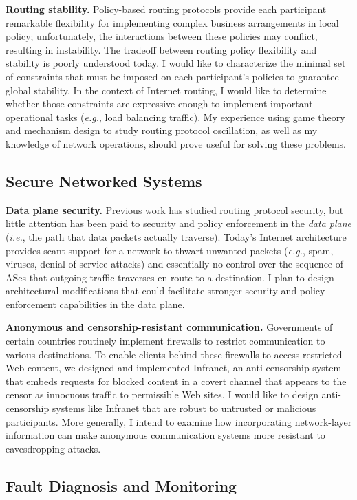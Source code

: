 \documentclass[11pt]{article}
\newcommand{\ie}{{\em i.e.}}
\newcommand{\eg}{{\em e.g.}}
\begin{document}
{\bf Routing stability.}  Policy-based routing protocols provide each
participant remarkable flexibility for implementing complex business
arrangements in local policy; unfortunately, the interactions between
these policies may conflict, resulting in instability.  The tradeoff
between routing policy flexibility and stability is poorly understood
today.  I would like to characterize the minimal set of constraints that
must be imposed on each participant's policies to guarantee global
stability. In the context of Internet routing, I would like to determine
whether those constraints are expressive enough to implement important
operational tasks (\eg, load balancing traffic).  My
experience using game theory and mechanism design to study routing
protocol oscillation, as well as my knowledge of network operations, should
prove useful for solving these problems.

\subsection*{Secure Networked Systems}

{\bf Data plane security.}  Previous work has studied routing protocol
security, but little attention has been paid to security and policy
enforcement in the {\em data plane} (\ie, the path that data packets
actually traverse).  Today's Internet architecture provides scant
support for a network to thwart unwanted packets (\eg, spam, viruses,
denial of service attacks) and essentially no control over the
sequence of ASes that outgoing traffic traverses en route to a
destination.  I plan to design architectural modifications that could
facilitate stronger security and policy enforcement capabilities in the
data plane.

{\bf Anonymous and censorship-resistant communication.}  Governments of
certain countries routinely implement firewalls to restrict communication
to various destinations.  To enable clients behind these firewalls to
access restricted Web content, we designed and implemented Infranet, an
anti-censorship system that embeds requests for blocked content in a
covert channel that appears to the censor as innocuous traffic to
permissible Web sites.  I would like to design
anti-censorship systems like Infranet that are robust to 
untrusted or malicious participants.  More generally, I intend to examine how
incorporating network-layer information can make anonymous communication
systems more resistant to eavesdropping attacks.


\subsection*{Fault Diagnosis and Monitoring}
\end{document}
